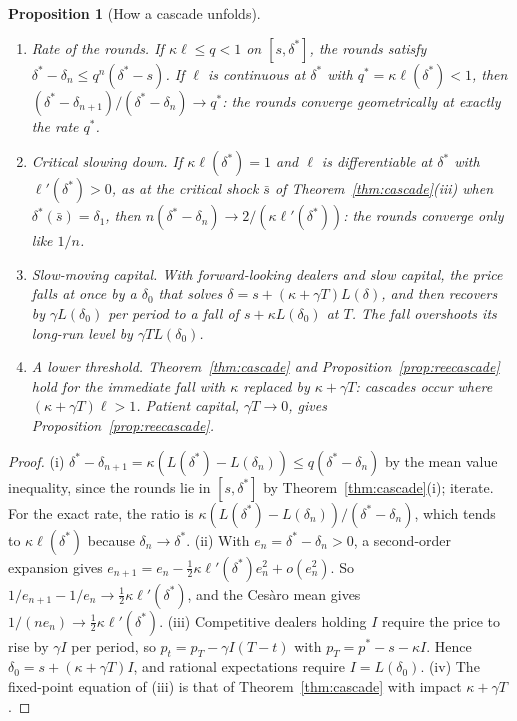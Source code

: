 \documentclass[12pt]{article}
\newtheorem{proposition}[theorem]{Proposition}
\theoremstyle{definition}
\theoremstyle{remark}
\begin{document}
\begin{proposition}[How a cascade unfolds]\label{prop:cascadedyn}
\begin{enumerate}[label=(\roman*),itemsep=1pt]
\item \emph{Rate of the rounds.} If $\kappa\ell\le q<1$ on $[s,\delta^*]$, the rounds satisfy $\delta^*-\delta_n\le q^n(\delta^*-s)$. If $\ell$ is continuous at $\delta^*$ with $q^*=\kappa\ell(\delta^*)<1$, then $(\delta^*-\delta_{n+1})/(\delta^*-\delta_n)\to q^*$: the rounds converge geometrically at exactly the rate $q^*$.
\item \emph{Critical slowing down.} If $\kappa\ell(\delta^*)=1$ and $\ell$ is differentiable at $\delta^*$ with $\ell'(\delta^*)>0$, as at the critical shock $\bar s$ of Theorem~\ref{thm:cascade}(iii) when $\delta^*(\bar s)=\delta_1$, then $n(\delta^*-\delta_n)\to2/(\kappa\ell'(\delta^*))$: the rounds converge only like $1/n$.
\item \emph{Slow-moving capital.} With forward-looking dealers and slow capital, the price falls at once by a $\delta_0$ that solves $\delta=s+(\kappa+\gamma T)L(\delta)$, and then recovers by $\gamma L(\delta_0)$ per period to a fall of $s+\kappa L(\delta_0)$ at $T$. The fall overshoots its long-run level by $\gamma TL(\delta_0)$.
\item \emph{A lower threshold.} Theorem~\ref{thm:cascade} and Proposition~\ref{prop:reecascade} hold for the immediate fall with $\kappa$ replaced by $\kappa+\gamma T$: cascades occur where $(\kappa+\gamma T)\ell>1$. Patient capital, $\gamma T\to0$, gives Proposition~\ref{prop:reecascade}.
\end{enumerate}
\end{proposition}

\begin{proof}
(i) $\delta^*-\delta_{n+1}=\kappa(L(\delta^*)-L(\delta_n))\le q(\delta^*-\delta_n)$ by the mean value inequality, since the rounds lie in $[s,\delta^*]$ by Theorem~\ref{thm:cascade}(i); iterate. For the exact rate, the ratio is $\kappa(L(\delta^*)-L(\delta_n))/(\delta^*-\delta_n)$, which tends to $\kappa\ell(\delta^*)$ because $\delta_n\to\delta^*$. (ii) With $e_n=\delta^*-\delta_n>0$, a second-order expansion gives $e_{n+1}=e_n-\frac12\kappa\ell'(\delta^*)e_n^2+o(e_n^2)$. So $1/e_{n+1}-1/e_n\to\frac12\kappa\ell'(\delta^*)$, and the Ces\`aro mean gives $1/(ne_n)\to\frac12\kappa\ell'(\delta^*)$. (iii) Competitive dealers holding $I$ require the price to rise by $\gamma I$ per period, so $p_t=p_T-\gamma I(T-t)$ with $p_T=p^*-s-\kappa I$. Hence $\delta_0=s+(\kappa+\gamma T)I$, and rational expectations require $I=L(\delta_0)$. (iv) The fixed-point equation of (iii) is that of Theorem~\ref{thm:cascade} with impact $\kappa+\gamma T$.
\end{proof}
\end{document}
